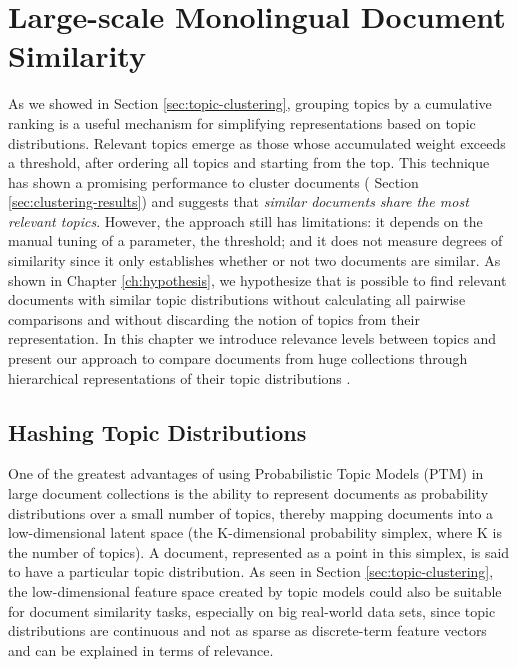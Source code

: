 

\chapter{Large-scale Monolingual Document Similarity}\label{ch:comparisons}

\graphicspath{{comparisons/figures/}}


As we showed in Section \ref{sec:topic-clustering}, grouping topics by a cumulative ranking is a useful mechanism for simplifying representations based on topic distributions. Relevant topics emerge as those whose accumulated weight exceeds a threshold, after ordering all topics and starting from the top. This technique has shown a promising performance to cluster documents ( Section \ref{sec:clustering-results}) and  suggests that \textit{similar documents share the most relevant topics}. However, the approach still has limitations: it depends on the manual tuning of a parameter, the threshold; and it does not measure degrees of similarity since it only establishes whether or not two documents are similar. As shown in Chapter \ref{ch:hypothesis}, we hypothesize that is possible to find relevant documents with similar topic distributions without calculating all pairwise comparisons and without discarding the notion of topics from their representation. In this chapter we introduce relevance levels between topics and present our approach to compare documents from huge collections through hierarchical representations of their topic distributions \citep{Badenes-Olmedo2019}.

\section{Hashing Topic Distributions}
\label{sec:comparison-hashing}

One of the greatest advantages of using Probabilistic Topic Models (PTM) in large document collections is the ability to represent documents as probability distributions over a small number of topics, thereby mapping documents into a low-dimensional latent space (the K-dimensional probability simplex, where K is the number of topics). A document, represented as a point in this simplex, is said to have a particular topic distribution. As seen in Section \ref{sec:topic-clustering}, the low-dimensional feature space created by topic models could also be suitable for document similarity tasks, especially on big real-world data sets, since topic distributions are continuous and not as sparse as discrete-term feature vectors and can be explained in terms of relevance. 


